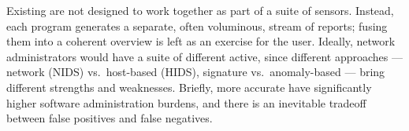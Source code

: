 Existing \idses are not designed to work together as part of a
suite of sensors.  Instead, each program generates a separate,
often voluminous, stream of reports; fusing them into a coherent 
overview is left as an exercise for the user. 
Ideally, network administrators would have a suite of different \idses active,
since different \ids approaches --- network (NIDS) vs.\
host-based (HIDS), signature vs.\ anomaly-based --- bring different
strengths and weaknesses.
Briefly, more accurate \idses have significantly higher software
administration burdens, and there is an inevitable tradeoff between
false positives and false negatives.
 
